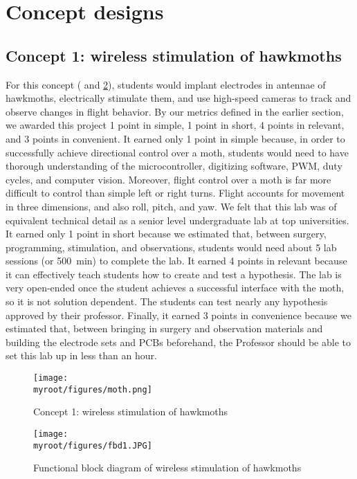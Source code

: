 \documentclass[twocolumn,10pt]{IEEEtran}
\newcommand{\myroot}{.}
\begin{document}
\section{Concept designs}
\subsection{Concept 1: wireless stimulation of hawkmoths}
For this concept ( and \ref{fig:FBD1}), students would implant electrodes in antennae of hawkmoths, electrically stimulate them, and use high-speed cameras to track and observe changes in flight behavior. By our metrics defined in the earlier section, we awarded this project 1 point in simple, 1 point in short, 4 points in relevant, and 3 points in convenient. It earned only 1 point in simple because, in order to successfully achieve directional control over a moth, students would need to have thorough understanding of the microcontroller, digitizing software, PWM, duty cycles, and computer vision. Moreover, flight control over a moth is far more difficult to control than simple left or right turns. Flight accounts for movement in three dimensions, and also roll, pitch, and yaw. We felt that this lab was of equivalent technical detail as a senior level undergraduate lab at top universities. It earned only 1 point in short because we estimated that, between surgery, programming, stimulation, and observations, students would need about 5 lab sessions (or \SI{500}{\minute}) to complete the lab. It earned 4 points in relevant because it can effectively teach students how to create and test a hypothesis. The lab is very open-ended once the student achieves a successful interface with the moth, so it is not solution dependent. The students can test nearly any hypothesis approved by their professor. Finally, it earned 3 points in convenience because we estimated that, between bringing in surgery and observation materials and building the electrode sets and PCBs beforehand, the Professor should be able to set this lab up in less than an hour.
\begin{figure}[ht!]
\centering
\texttt{[image: \\myroot/figures/moth.png]}
\caption{Concept 1: wireless stimulation of hawkmoths}
\label{fig:concept1}
\end{figure}
\begin{figure}[ht!]
\centering
\texttt{[image: \\myroot/figures/fbd1.JPG]}
\caption{Functional block diagram of wireless stimulation of hawkmoths}
\label{fig:FBD1}
\end{figure}
\end{document}
